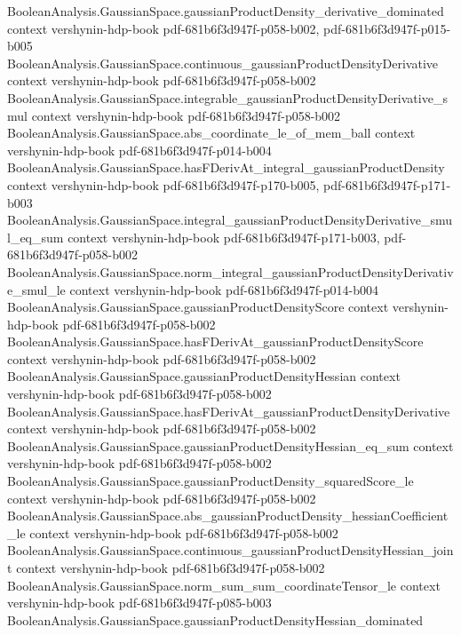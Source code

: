 \begin{theorem}
\proofstep
  {BooleanAnalysis.GaussianSpace.gaussianProductDensity_derivative_dominated}
  {context}
  {vershynin-hdp-book}
  {pdf-681b6f3d947f-p058-b002,
    pdf-681b6f3d947f-p015-b005}
\proofstep
  {BooleanAnalysis.GaussianSpace.continuous_gaussianProductDensityDerivative}
  {context}
  {vershynin-hdp-book}
  {pdf-681b6f3d947f-p058-b002}
\proofstep
  {BooleanAnalysis.GaussianSpace.integrable_gaussianProductDensityDerivative_smul}
  {context}
  {vershynin-hdp-book}
  {pdf-681b6f3d947f-p058-b002}
\proofstep
  {BooleanAnalysis.GaussianSpace.abs_coordinate_le_of_mem_ball}
  {context}
  {vershynin-hdp-book}
  {pdf-681b6f3d947f-p014-b004}
\proofstep
  {BooleanAnalysis.GaussianSpace.hasFDerivAt_integral_gaussianProductDensity}
  {context}
  {vershynin-hdp-book}
  {pdf-681b6f3d947f-p170-b005,
    pdf-681b6f3d947f-p171-b003}
\proofstep
  {BooleanAnalysis.GaussianSpace.integral_gaussianProductDensityDerivative_smul_eq_sum}
  {context}
  {vershynin-hdp-book}
  {pdf-681b6f3d947f-p171-b003,
    pdf-681b6f3d947f-p058-b002}
\proofstep
  {BooleanAnalysis.GaussianSpace.norm_integral_gaussianProductDensityDerivative_smul_le}
  {context}
  {vershynin-hdp-book}
  {pdf-681b6f3d947f-p014-b004}
\proofstep
  {BooleanAnalysis.GaussianSpace.gaussianProductDensityScore}
  {context}
  {vershynin-hdp-book}
  {pdf-681b6f3d947f-p058-b002}
\proofstep
  {BooleanAnalysis.GaussianSpace.hasFDerivAt_gaussianProductDensityScore}
  {context}
  {vershynin-hdp-book}
  {pdf-681b6f3d947f-p058-b002}
\proofstep
  {BooleanAnalysis.GaussianSpace.gaussianProductDensityHessian}
  {context}
  {vershynin-hdp-book}
  {pdf-681b6f3d947f-p058-b002}
\proofstep
  {BooleanAnalysis.GaussianSpace.hasFDerivAt_gaussianProductDensityDerivative}
  {context}
  {vershynin-hdp-book}
  {pdf-681b6f3d947f-p058-b002}
\proofstep
  {BooleanAnalysis.GaussianSpace.gaussianProductDensityHessian_eq_sum}
  {context}
  {vershynin-hdp-book}
  {pdf-681b6f3d947f-p058-b002}
\proofstep
  {BooleanAnalysis.GaussianSpace.gaussianProductDensity_squaredScore_le}
  {context}
  {vershynin-hdp-book}
  {pdf-681b6f3d947f-p058-b002}
\proofstep
  {BooleanAnalysis.GaussianSpace.abs_gaussianProductDensity_hessianCoefficient_le}
  {context}
  {vershynin-hdp-book}
  {pdf-681b6f3d947f-p058-b002}
\proofstep
  {BooleanAnalysis.GaussianSpace.continuous_gaussianProductDensityHessian_joint}
  {context}
  {vershynin-hdp-book}
  {pdf-681b6f3d947f-p058-b002}
\proofstep
  {BooleanAnalysis.GaussianSpace.norm_sum_sum_coordinateTensor_le}
  {context}
  {vershynin-hdp-book}
  {pdf-681b6f3d947f-p085-b003}
\proofstep
  {BooleanAnalysis.GaussianSpace.gaussianProductDensityHessian_dominated}

\end{theorem}
